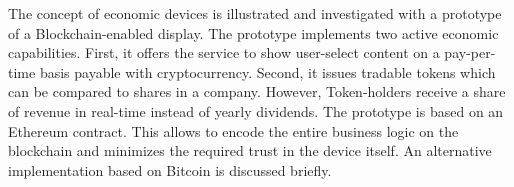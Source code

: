 The concept of economic devices is illustrated and investigated with a prototype of a Blockchain-enabled display. The prototype implements two active economic capabilities. First, it offers the service to show user-select content on a pay-per-time basis payable with cryptocurrency. Second, it issues tradable tokens which can be compared to shares in a company. However, Token-holders receive a share of revenue in real-time instead of yearly dividends. The prototype is based on an Ethereum contract. This allows to encode the entire business logic on the blockchain and minimizes the required trust in the device itself. An alternative implementation based on Bitcoin is discussed briefly. 











